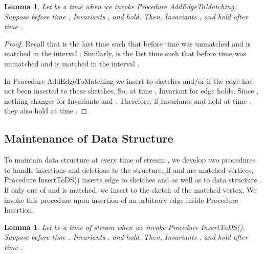 \documentclass[11pt,letter]{article}
\newtheorem{lemma}[theorem]{Lemma}
\begin{document}
\begin{lemma}
 \label{lem:timestamps:case:1}
Let  be a time when we invoke Procedure {\sf AddEdgeToMatching}.
Suppose before time , Invariants ,  and  hold.
Then, Invariants ,  and  hold after time .
\end{lemma}

\begin{proof}
Recall that  is the last time  such that  before time  was
unmatched and is matched in the interval .
Similarly,  is the last time  such that  before time  was
unmatched and is matched in the interval .

In Procedure {\sf AddEdgeToMatching} we insert  to sketches
 and/or  if the edge has not been inserted to these sketches.
So, at time , Invariant  for edge  holds.
Since , nothing changes for Invariants  and .
Therefore, if Invariants  and  hold at time ,
they also hold at time .
\end{proof}




\subsection{Maintenance of Data Structure }
To maintain data structure  at every time  of stream ,
we develop two procedures to handle insertions and deletions to the
structure.
If  and  are  matched vertices,
Procedure {\sf InsertToDS()} inserts edge 
to sketches  and  as well as to data structure .
If only one of  and  is matched, we insert 
to the sketch of the matched vertex.
We invoke this procedure upon insertion of an arbitrary edge 
inside Procedure {\sf Insertion}.



\begin{center}
\end{center}





\begin{lemma}
 \label{lem:timestamps:case:2}
Let  be a time of stream  when we invoke Procedure {\sf InsertToDS()}.
Suppose before time , Invariants ,  and  hold.
Then, Invariants ,  and  hold after time .
\end{lemma}
\end{document}
